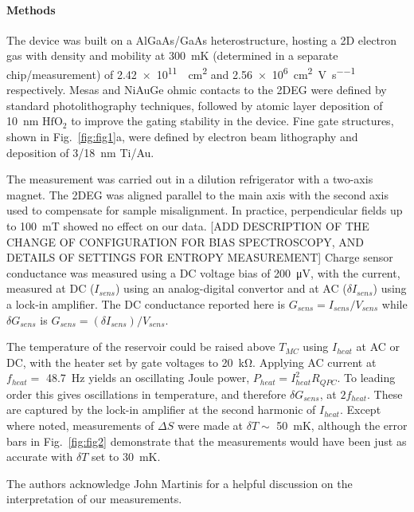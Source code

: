 \documentclass[twocolumn,showpacs,amsmath,amssymb,prl,aps,superscriptaddress]{revtex4-1}
\begin{document}
\paragraph*{Methods} The device was built on a AlGaAs/GaAs heterostructure, hosting a 2D electron gas with density and mobility at \SI{300}{\milli\kelvin} (determined in a separate chip/measurement) of \SI{2.42e11}{\per\square\centi\metre} and \SI[per-mode=symbol]{2.56e6}{\square\centi\metre\per\volt\per\second} respectively.   Mesas and NiAuGe ohmic contacts to the 2DEG were defined by standard photolithography techniques, followed by atomic layer deposition of \SI{10}{\nano\metre} $\mathrm{HfO_2}$ to improve the gating stability in the device. Fine gate structures, shown in Fig.~\ref{fig:fig1}a, were defined by electron beam lithography and deposition of \SI{3/18}{\nano\metre} Ti/Au. 

The measurement was carried out in a dilution refrigerator with a two-axis magnet. The 2DEG was aligned parallel to the main axis with the second axis used to compensate for sample misalignment. In practice, perpendicular fields up to \SI{100}{\milli\tesla} showed no effect on our data. [ADD DESCRIPTION OF THE CHANGE OF CONFIGURATION FOR BIAS SPECTROSCOPY, AND DETAILS OF SETTINGS FOR ENTROPY MEASUREMENT]  Charge sensor conductance was measured using a DC voltage bias of \SI{200}{\micro\volt}, with the current, measured at DC ($I_{sens}$) using an analog-digital convertor and at AC ($\delta I_{sens}$) using a lock-in amplifier. The DC conductance reported here is $G_{sens}=I_{sens}/V_{sens}$ while $\delta G_{sens}$ is $G_{sens}=(\delta I_{sens})/V_{sens}$.

The temperature of the reservoir could be raised above $T_{MC}$ using $I_{heat}$ at AC or DC, with the heater set by gate voltages to \SI{20}{\kilo\ohm}. Applying AC current at $f_{heat} =$ \SI{48.7}{\hertz} yields an oscillating Joule power, $P_{heat} = I^2_{heat}R_{QPC}$. To leading order this gives oscillations in temperature, and therefore $\delta G_{sens}$, at $2f_{heat}$.  These are  captured by the lock-in amplifier at the second harmonic of $I_{heat}$.  Except where noted, measurements of $\Delta S$ were made at $\delta T \sim $ \SI{50}{\milli\kelvin}, although the error bars in Fig.~\ref{fig:fig2} demonstrate that the measurements would have been just as accurate with $\delta T$ set to \SI{30}{\milli\kelvin}.


\acknowledgments
The authors acknowledge John Martinis for a helpful discussion on the interpretation of our measurements.

{}

\end{document}
